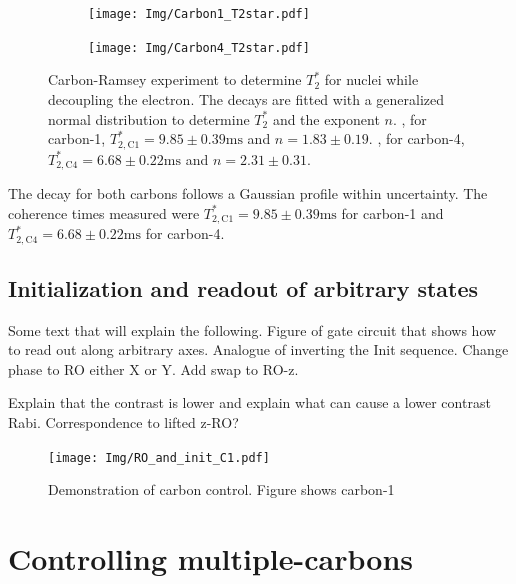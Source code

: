 \begin{figure}[htbp]
    \begin{subfigure}[t]{0.49\textwidth}\centering
        \caption{}
        \texttt{[image: Img/Carbon1\_T2star.pdf]}
        \label{fig:T2star_carbon1}
    \end{subfigure}
    \begin{subfigure}[t]{0.49\textwidth}\centering
        \caption{}
        \texttt{[image: Img/Carbon4\_T2star.pdf]}
        \label{fig:T2star_carbon4}
    \end{subfigure}
    \caption{Carbon-Ramsey experiment to determine $T_2^*$ for nuclei while decoupling the electron.
    The decays are fitted with a generalized normal distribution to determine $T_2^*$ and the exponent $n$.
    , for carbon-1, $T_{2,\mathrm{C1}}^* =9.85 \pm   0.39 \mathrm{ms}$ and $n= 1.83 \pm 0.19$.
    , for carbon-4,  $T_{2,\mathrm{C4}}^* =6.68 \pm   0.22 \mathrm{ms}$ and $n= 2.31 \pm 0.31$. } %
    \label{fig:T2star_carbon}
\end{figure}

The decay for both carbons follows a Gaussian profile within uncertainty.
The coherence times measured were $T_{2,\mathrm{C1}}^* =9.85 \pm   0.39 \mathrm{ms}$ for carbon-1 and $T_{2,\mathrm{C4}}^* =6.68 \pm   0.22 \mathrm{ms}$ for carbon-4.
\subsection{Initialization and readout of arbitrary states}



Some text that will explain the following.
Figure of gate circuit that shows how to read out along arbitrary axes. Analogue of inverting the Init sequence. Change phase to RO either X or Y. Add swap to RO-z.

Explain that the contrast is lower and explain what can cause a lower contrast Rabi.
Correspondence to lifted z-RO?


\begin{figure}[htbp]
    \centering
    \texttt{[image: Img/RO\_and\_init\_C1.pdf]}
    \caption{Demonstration of carbon control. Figure shows carbon-1 }
    \label{fig:control_demo}
\end{figure}

\section{Controlling multiple-carbons}
